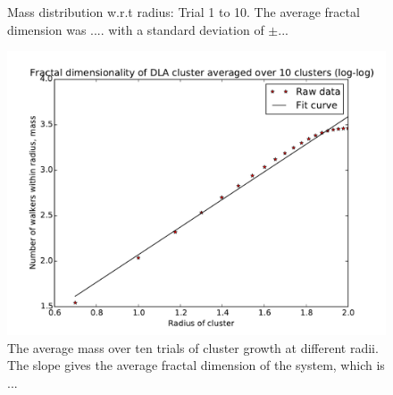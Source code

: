 \documentclass[a4paper,12pt]{article}
\begin{document}
\begin{figure}[H]
\begin{tabular}{@{}cc@{}}
	\end{tabular}
	\caption{Mass distribution w.r.t radius: Trial 1 to 10. The average fractal dimension was .... with a standard deviation of $\pm...$}
	\label{FractalDimension}
\end{figure}

\begin{figure}[H]
\begin{center}
\includegraphics[width = \textwidth]{pics/Fractal_dimension_final_avg.pdf}
\caption{The average mass over ten trials of cluster growth at different radii. The slope gives the average fractal dimension of the system, which is ...}
\label{AvgFractalDimension}
\end{center}
\end{figure}
\end{document}
